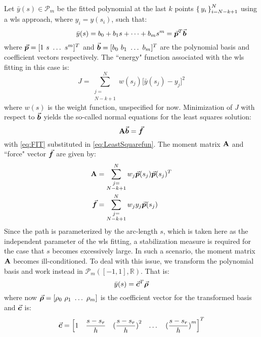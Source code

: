 Let $\bar{y}(s)\in\mathcal{P}_m$ be the fitted polynomial at the last $k$ points
$\set{y_i}_{i=N-k+1}^N$ using a \acrshort{wls} approach, where $y_i=y(s_i)$, 
such that:
\begin{equation}
	\bar{y}(s) = b_0+b_1s+\cdots +b_ms^m=\vec{\bm{p}}^T\vec{\bm{b}}
	\label{eq:FIT}
\end{equation}
where $\vec{\bm{p}}=[1\ s\ \dots\ s^m]^T$ and $\vec{\bm{b}}=[b_0\ b_1\ \dots\ b_m]^T$ 
are the polynomial basis and coefficient vectors respectively. 
The ``energy" function associated with the \acrshort{wls} fitting in this case 
is:
\begin{equation}
	J = \sum_{\substack{j=\\ N-k+1}}^N w(s_j)\bigg[\bar{y}(s_j)-y_j\bigg]^2
	\label{eq:LeastSquarefun}
\end{equation}
where $w(s)$ is the weight function, unspecified for now. Minimization of $J$ 
with respect to $\vec{\bm{b}}$ yields the so-called normal equations for the least
squares solution: 
\begin{equation}
	\mathbf{A}\vec{\bm{b}}=\vec{\bm{f}}
	\label{eq:NORMAL}
\end{equation}
with \ref{eq:FIT} substituted in \ref{eq:LeastSquarefun}. The moment
matrix $\mathbf{A}$ and ``force" vector $\vec{\bm{f}}$ are given by:
\begin{subequations}
	\begin{align}
		\mathbf{A} &= \sum_{\substack{j=\\ N-k+1}}^N 
		w_j\vec{\bm{p}}(s_j)\vec{\bm{p}}(s_j)^T\label{eq:moment}\\ 
		\vec{\bm{f}} &= \sum_{\substack{j=\\ N-k+1}}^N 
		w_jy_j\vec{\bm{p}}(s_j)\label{eq:force}
	\end{align}
	\label{eq:MOMENTEQS}
\end{subequations}
Since the path is
parameterized by the arc-length $s$, which is taken here as the independent
parameter of the \acrshort{wls} fitting, a stabilization measure is required 
for the case
that $s$ becomes excessively large. In such a scenario, the moment matrix
$\mathbf{A}$ becomes ill-conditioned. To deal with this issue, we transform the 
polynomial basis and work instead in $\mathcal{P}_m([-1,1],\mathbb{R})$. 
That is:
\begin{equation}
	\bar{y}(s) = \vec{\bm{c}}^T\vec{\bm{\rho}}
	\label{eq:TFIT}
\end{equation}
where now $\vec{\bm{\rho}}=[\rho_0\ \rho_1\ \dots\ \rho_m]$ is the coefficient 
vector for the
transformed basis and $\vec{\bm{c}}$ is:
\begin{equation}
	\vec{\bm{c}} = \begin{bmatrix}
		1 & \dfrac{s-s_r}{h} & (\dfrac{s-s_r}{h})\strut^2 & \dots &
		(\dfrac{s-s_r}{h})\strut^m
	\end{bmatrix}^T
	\label{eq:TPOLYBASIS}
\end{equation}
